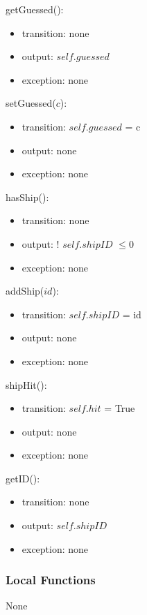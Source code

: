 \documentclass[12pt,fleqn]{article}
\begin{document}
    getGuessed():
    \begin{itemize}
    \item transition: none 
    \item output: $self.guessed$
    \item exception: none 
    \end{itemize}

    setGuessed($c$):
    \begin{itemize}
    \item transition: $self.guessed$ = c
    \item output: none
    \item exception: none 
    \end{itemize}    

    hasShip():
    \begin{itemize}
    \item transition: none 
    \item output: ! $self.shipID$ $\leq 0$ 
    \item exception: none 
    \end{itemize}    

    addShip($id$):
    \begin{itemize}
    \item transition: $self.shipID$ = id
    \item output: none
    \item exception: none 
    \end{itemize}        

    shipHit():
    \begin{itemize}
    \item transition: $self.hit$ = True
    \item output: none 
    \item exception: none 
    \end{itemize}            

    getID():
    \begin{itemize}
    \item transition: none
    \item output: $self.shipID$
    \item exception: none 
    \end{itemize}            


    \subsubsection*{Local Functions}
    None
\end{document}

